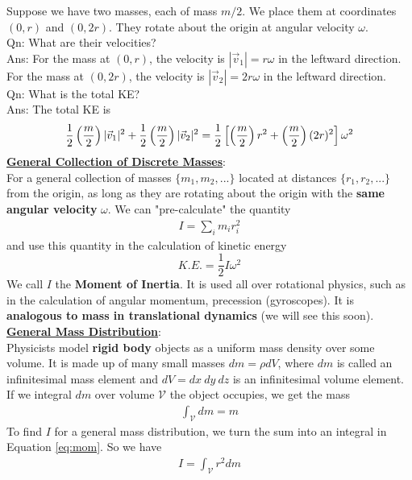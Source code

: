 \documentclass{article}
\begin{document}
Suppose we have two masses, each of mass $m/2$. We place them at coordinates $(0,r)$ and $(0,2r)$. They rotate about the origin at angular velocity $\omega$.\\[10pt]
Qn: What are their velocities? \\[0pt]
Ans: For the mass at $(0,r)$, the velocity is $|\vec{v}_1| = r\omega$ in the leftward direction. For the mass at $(0,2r)$, the velocity is $|\vec{v}_2| = 2r\omega$ in the leftward direction. \\[10pt]
Qn: What is the total KE? \\[0pt]
Ans: The total KE is 
\begin{align}
\frac{1}{2} \left(\frac{m}{2}\right) |\vec{v}_1|^2 + \frac{1}{2} \left(\frac{m}{2}\right) |\vec{v}_2|^2 = \frac{1}{2} \left[ \left(\frac{m}{2} \right) r^2 + \left( \frac{m}{2}\right) (2r)^2 \right] \omega^2 \notag 
\end{align}
\underline{\textbf{General Collection of Discrete Masses}}: \\[2pt] For a general collection of masses $\{m_1,m_2,...\}$ located at distances $\{r_1, r_2, ...\}$ from the origin, as long as they are rotating about the origin with the \textbf{same angular velocity} $\omega$. We can "pre-calculate" the quantity 
\begin{align}
I = \sum_i m_i r_i^2  \label{eq:mom}    
\end{align}
and use this quantity in the calculation of kinetic energy $$K.E. = \frac{1}{2} I \omega^2 $$
We call $I$ the \textbf{Moment of Inertia}. It is used all over rotational physics, such as in the calculation of angular momentum, precession (gyroscopes). It is \textbf{analogous to mass in translational dynamics} (we will see this soon).\\[10pt]
\underline{\textbf{General Mass Distribution}}: \\[2pt] Physicists model \textbf{rigid body} objects as a uniform mass density over some volume. It is made up of many small masses $dm = \rho dV$, where $dm$ is called an infinitesimal mass element and $dV = dx\ dy\ dz$ is an infinitesimal volume element. If we integral $dm$ over volume $\mathcal{V}$ the object occupies, we get the mass
\begin{align}
    \int_{\mathcal V} dm = m
\end{align}
To find $I$ for a general mass distribution, we turn the sum into an integral in Equation \ref{eq:mom}. So we have
\begin{align}
    I = \int_{\mathcal V} r^2 dm 
\end{align}
\end{document}

